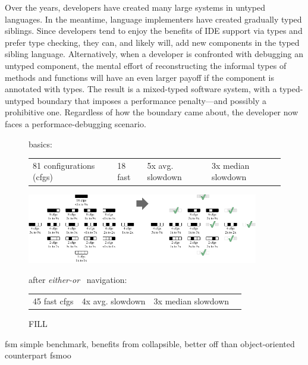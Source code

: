 
Over the years, developers have created many large systems in untyped languages.
In the meantime, language implementers have created gradually typed siblings.
Since developers tend to enjoy the benefits of IDE support via types and prefer
type checking, they can, and likely will, add new components in the typed
sibling language. Alternatively, when a developer is confronted with debugging
an untyped component, the mental effort of reconstructing the informal types of
methods and functions will have an even larger payoff if the component is
annotated with types. The result is a mixed-typed software system, with a
typed-untyped boundary that imposes a performance penalty---and possibly a
prohibitive one. Regardless of how the boundary came about, the developer now
faces a performace-debugging scenario. 

\begin{figure}[htb]

     basics:
    \begin{tabular}{llll}
      81 configurations (cfgs) &
      18 fast &
      5x avg. slowdown &
      3x median slowdown
    \end{tabular}

    \bigskip

    \includegraphics[width=0.9\textwidth]{data/fsm-lattice.pdf}

    after \emph{either-or}~\cite{g-deep-shallow} navigation:
    \begin{tabular}{llll}
      45 fast cfgs &
      4x avg. slowdown &
      3x median slowdown
    \end{tabular}

  \caption{FILL}
  \label{f:fsm-seascape}
\end{figure}

fsm simple benchmark,
benefits from collapsible, better off than object-oriented counterpart fsmoo



